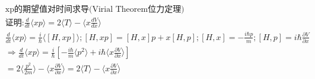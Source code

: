 \documentclass[UTF8,a4paper,10pt]{ctexart}
\begin{document}
\begin{equation}
    \begin{aligned}
        &\text{xp的期望值对时间求导(Virial Theorem位力定理)}\\
        &\text{证明:}\frac{d}{dt}\langle xp\rangle=2\langle T\rangle-\langle x\frac{dV}{dx}\rangle\\
        &\frac{d}{dt}\langle xp\rangle=\frac{i}{\hbar}\langle[H,xp]\rangle;[H,xp]=[H,x]p+x[H,p];[H,x]=-\frac{i\hbar p}{m};[H,p]=i\hbar\frac{\partial V}{\partial x}\\
        &\Longrightarrow\frac{d}{dt}\langle xp\rangle=\frac{i}{\hbar}[-\frac{i\hbar}{m}\langle p^2\rangle+i\hbar\langle x\frac{\partial V}{\partial x}\rangle]\\
        &=2\langle\frac{p^2}{2m}\rangle-\langle x\frac{\partial V}{\partial x}\rangle=2\langle T\rangle-\langle x\frac{\partial V}{\partial x}\rangle\\
    \end{aligned}
\end{equation}


\end{document}
